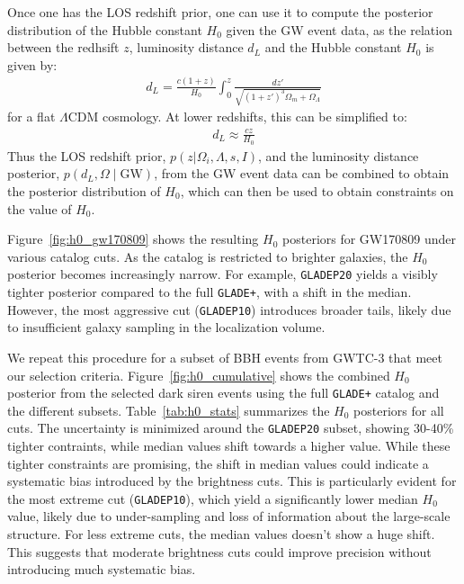Once one has the \ac{LOS} redshift prior, one can use it to compute the posterior distribution of the Hubble constant $H_0$ given the \ac{GW} event data, as the relation between the redhsift $z$, luminosity distance $d_L$ and the Hubble constant $H_0$ is given by:
\begin{align}
  d_L = \frac{c(1+z)}{H_0} \int_0^z \frac{dz'}{\sqrt{(1+z')^3\Omega_m + \Omega_\Lambda}}
\end{align}
for a flat $\Lambda$CDM cosmology. At lower redshifts, this can be simplified to:
\begin{align}
  d_L \approx \frac{cz}{H_0}
\end{align}
Thus the \ac{LOS} redshift prior, $p(z|\Omega_i, \Lambda, s, I)$, and the luminosity distance posterior, $p(d_L,\Omega\mid\mathrm{GW})$, from the \ac{GW} event data can be combined to obtain the posterior distribution of $H_0$, which can then be used to obtain constraints on the value of $H_0$.

Figure~\ref{fig:h0_gw170809} shows the resulting $H_0$ posteriors for GW170809 under various catalog cuts. As the catalog is restricted to brighter galaxies, the $H_0$ posterior becomes increasingly narrow. For example, \texttt{GLADEP20} yields a visibly tighter posterior compared to the full \texttt{GLADE+}, with a shift in the median. However, the most aggressive cut (\texttt{GLADEP10}) introduces broader tails, likely due to insufficient galaxy sampling in the localization volume.

We repeat this procedure for a subset of \ac{BBH} events from \ac{GWTC}-3 that meet our selection criteria. Figure~\ref{fig:h0_cumulative} shows the combined $H_0$ posterior from the selected dark siren events using the full \texttt{GLADE+} catalog and the different subsets. Table~\ref{tab:h0_stats} summarizes the $H_0$ posteriors for all cuts. The uncertainty is minimized around the \texttt{GLADEP20} subset, showing 30-40\% tighter contraints, while median values shift towards a higher value. While these tighter constraints are promising, the shift in median values could indicate a systematic bias introduced by the brightness cuts. This is particularly evident for the most extreme cut (\texttt{GLADEP10}), which yield a significantly lower median $H_0$ value, likely due to under-sampling and loss of information about the large-scale structure. For less extreme cuts, the median values doesn't show a huge shift. This suggests that moderate brightness cuts could improve precision without introducing much systematic bias.

